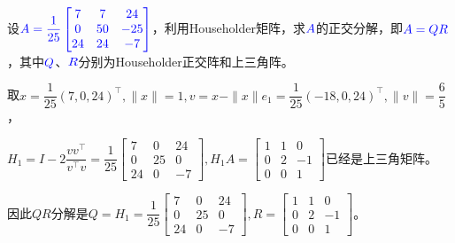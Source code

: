     \begin{homework}[10pts]
        设$\textcolor{blue}{A=\dfrac{1}{25}\begin{bmatrix}7&7&24\\0&50&-25\\24&24&-7\end{bmatrix}}$，利用Householder矩阵，求$\textcolor{blue}{A}$的正交分解，即$\textcolor{blue}{A=QR}$，其中$\textcolor{blue}{Q}$、$\textcolor{blue}{R}$分别为Householder正交阵和上三角阵。
    \end{homework}

    \begin{solution}
        取$x=\dfrac1{25}(7,0,24)^{\top},\|x\|=1,v=x-\|x\|e_1=\dfrac1{25}(-18,0,24)^{\top},\|v\|=\dfrac65$，

        $H_1=I-2\dfrac{vv^{\top}}{v^{\top}v}=\dfrac1{25}\begin{bmatrix}7&0&24\\0&25&0\\24&0&-7\end{bmatrix},H_1 A=\begin{bmatrix}1&1&0\\0&2&-1\\0&0&1\end{bmatrix}$已经是上三角矩阵。

        因此$QR$分解是$Q=H_1=\dfrac1{25}\begin{bmatrix}7&0&24\\0&25&0\\24&0&-7\end{bmatrix},R=\begin{bmatrix}1&1&0\\0&2&-1\\0&0&1\end{bmatrix}$。
    \end{solution}

